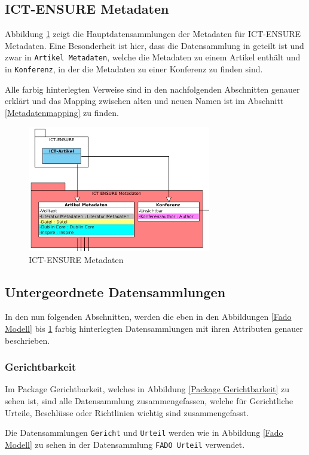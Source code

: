 \FloatBarrier
\subsection{ICT-ENSURE Metadaten}\label{ICT-ENSURE Metadaten}
Abbildung \ref{ICT-ENSURE Modell} zeigt die Hauptdatensammlungen der Metadaten f\"ur \ac{ICT-ENSURE} Metadaten. Eine Besonderheit ist hier, dass die Datensammlung in geteilt ist und zwar in \texttt{Artikel Metadaten}, welche die Metadaten zu einem Artikel enth\"alt und in \texttt{Konferenz}, in der die Metadaten zu einer Konferenz zu finden sind.

Alle farbig hinterlegten Verweise sind in den nachfolgenden Abschnitten genauer erkl\"art und das Mapping zwischen alten und neuen Namen ist im Abschnitt \ref{Metadatenmapping} zu finden.
\begin{figure}[!ht]
\centering
\includegraphics[width=8cm]{Bilder/Datenmodell/ICT-ENSURE-Metadaten.jpg}
\caption{ICT-ENSURE Metadaten}
\label{ICT-ENSURE Modell}
\centering
\end{figure}

\FloatBarrier
\subsection{Untergeordnete Datensammlungen}
In den nun folgenden Abschnitten, werden die eben in den Abbildungen \ref{Fado Modell} bis \ref{ICT-ENSURE Modell} farbig hinterlegten Datensammlungen mit ihren Attributen genauer beschrieben. 

\subsubsection{Gerichtbarkeit}
Im Package Gerichtbarkeit, welches in Abbildung \ref{Package Gerichtbarkeit} zu sehen ist, sind alle Datensammlung zusammengefassen, welche f\"ur Gerichtliche Urteile, Beschl\"usse oder Richtlinien wichtig sind zusammengefasst.

Die Datensammlungen \texttt{Gericht} und \texttt{Urteil} werden wie in Abbildung \ref{Fado Modell} zu sehen in der Datensammlung \texttt{FADO Urteil} verwendet.

